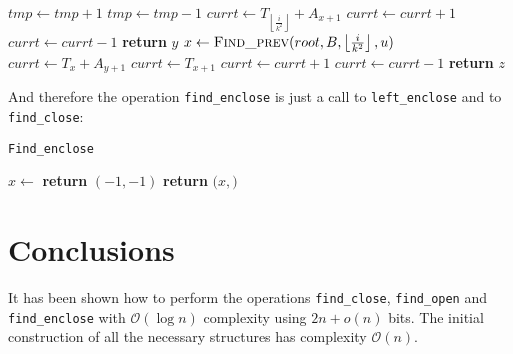 \documentclass{article}
\begin{document}
    \begin{algorithm}[ht]
    \begin{algorithmic}[1]
                \State $tmp\gets tmp+1$
            \EndIf
                \State $tmp\gets tmp-1$
            \EndIf
        \EndFor
                \State $currt\gets T_{\left\lfloor{\frac{i}{k^2}}\right\rfloor}+A_{x+1}$
                        \State $currt\gets currt+1$
                    \EndIf
                        \State $currt\gets currt-1$
                    \EndIf
                        \State \textbf{return} $y$
                    \EndIf
                \EndFor
            \EndIf
        \EndFor
        \State
        \State $x\gets \Call{Find\_prev}{root,B,\left\lfloor{\frac{i}{k^2}}\right\rfloor,u}$ 
                    \State $currt\gets T_x+A_{y+1}$
                \Else
                    \State $currt\gets T_{x+1}$
                \EndIf
                        \State $currt\gets currt+1$
                    \EndIf
                        \State $currt\gets currt-1$
                    \EndIf
                        \State \textbf{return} $z$
                    \EndIf
                \EndFor
            \EndIf
        \EndFor
    \EndProcedure
    \end{algorithmic}
    \end{algorithm}
And therefore the operation \texttt{find\_enclose} is just a call to \texttt{left\_enclose} and to \texttt{find\_close}:
    \begin{algorithm}[H]
    \caption{\texttt{Find\_enclose}}\label{findenclose}
    \begin{algorithmic}[1]
    \State $x\gets$ 
        \State \textbf{return} $(-1,-1)$ 
    \Else
        \State \textbf{return} $(x,$$)$
    \EndIf
    \EndProcedure
    \end{algorithmic}
    \end{algorithm}
\section{Conclusions}
It has been shown how to perform the operations \texttt{find\_close}, \texttt{find\_open} and \texttt{find\_enclose} with $\mathcal{O}(\log{n})$ complexity using $2n+o(n)$ bits. The initial construction of all the necessary structures has complexity $\mathcal{O}(n)$.
\end{document}
